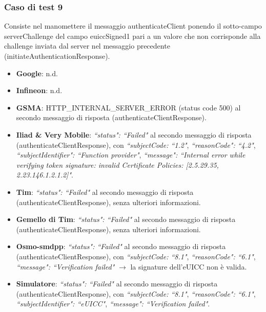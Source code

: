 \documentclass[10pt, oneside]{book}
\begin{document}
\subsubsection{Caso di test 9}
Consiste nel manomettere il messaggio authenticateClient ponendo il sotto-campo serverChallenge del campo euiccSigned1 pari a un valore che non corrisponde alla challenge inviata dal server nel messaggio precedente (initiateAuthenticationResponse).
\begin{itemize}
\item \textbf{Google}: n.d.
\item \textbf{Infineon}: n.d.
\item \textbf{GSMA}: HTTP\_INTERNAL\_SERVER\_ERROR (status code 500) al secondo messaggio di risposta (authenticateClientResponse).
\item \textbf{Iliad \& Very Mobile}: \textit{``status": ``Failed"} al secondo messaggio di risposta (authenticateClientResponse), con \textit{``subjectCode: ``1.2"}, \textit{``reasonCode": ``4.2"}, \textit{``subjectIdentifier": ``Function provider"}, \textit{``message": ``Internal error while verifying token signature: invalid Certificate Policies: [2.5.29.35, 2.23.146.1.2.1.2]"}.
\item \textbf{Tim}: \textit{``status": ``Failed"} al secondo messaggio di risposta (authenticateClientResponse), senza ulteriori informazioni.
\item \textbf{Gemello di Tim}: \textit{``status": ``Failed"} al secondo messaggio di risposta (authenticateClientResponse), senza ulteriori informazioni.
\item \textbf{Osmo-smdpp}: \textit{``status": ``Failed"} al secondo messaggio di risposta (authenticateClientResponse), con \textit{``subjectCode: ``8.1"}, \textit{``reasonCode": ``6.1"}, \textit{``message": ``Verification failed"} $\rightarrow$ la signature dell'eUICC non è valida.
\item \textbf{Simulatore}: \textit{``status": ``Failed"} al secondo messaggio di risposta (authenticateClientResponse), con \textit{``subjectCode: ``8.1"}, \textit{``reasonCode": ``6.1"}, \textit{``subjectIdentifier": ``eUICC"}, \textit{``message": ``Verification failed"}.
\end{itemize}
\end{document}
